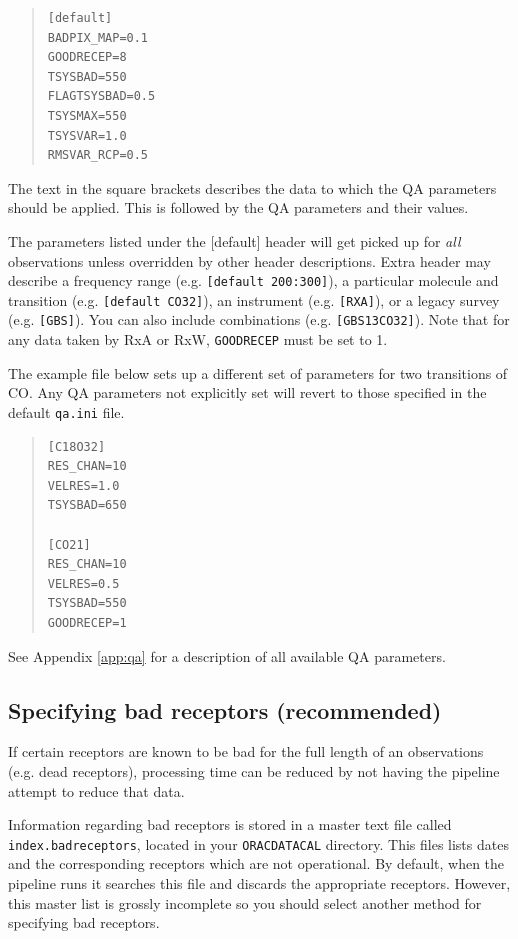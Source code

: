 \documentclass[twoside,11pt]{article}
\renewcommand{\_}{\texttt{\symbol{95}}}
\newcommand{\param}[1]{\texttt{#1}}
\begin{document}
\vspace{0.2cm}
\begin{quote}
\begin{verbatim}
[default]
BADPIX_MAP=0.1
GOODRECEP=8
TSYSBAD=550
FLAGTSYSBAD=0.5
TSYSMAX=550
TSYSVAR=1.0
RMSVAR_RCP=0.5
 \end{verbatim}
\end{quote}
The text in the square brackets describes the data to which the QA parameters should be applied. This is followed by the QA parameters and their values.

The parameters listed under the [default] header will get picked up for \textit{all} observations unless overridden by other header descriptions. Extra header may describe a frequency range (e.g. \texttt{[default 200:300]}), a particular molecule and transition (e.g. \texttt{[default CO32]}), an instrument  (e.g. \texttt{[RXA]}), or a legacy survey (e.g. \texttt{[GBS]}). You can also include combinations (e.g. \texttt{[GBS\_13CO32]}). Note that for any data taken by RxA or RxW, \param{GOODRECEP} must be set to 1.

The example file below sets up a different set of parameters for two transitions of CO. Any QA parameters not explicitly set will revert to those specified in the default \texttt{qa.ini} file.

\begin{center}
\vspace{0.2cm}
\begin{quote}
\begin{verbatim}
[C18O32]
RES_CHAN=10
VELRES=1.0
TSYSBAD=650

[CO21]
RES_CHAN=10
VELRES=0.5
TSYSBAD=550
GOODRECEP=1
\end{verbatim}
\end{quote}
\end{center}

See Appendix \ref{app:qa} for a description of all available QA parameters.


\subsection{Specifying bad receptors (recommended)}
\label{sec:badrec}
If certain receptors are known to be bad for the full length of an observations (e.g. dead receptors), processing time can be reduced by not having the pipeline attempt to reduce that data.

Information regarding bad receptors is stored in a master text file called \param{index.bad\_receptors}, located in your \param{ORAC\_DATA\_CAL} directory. This files lists dates and the corresponding receptors which are not operational. By default, when the pipeline runs it searches this file and discards the appropriate receptors. However, this master list is grossly  incomplete so you should select another method for specifying bad receptors.
\end{document}
